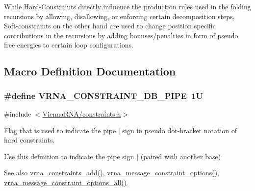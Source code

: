 While Hard-\/\+Constraints directly influence the production rules used in the folding recursions by allowing, disallowing, or enforcing certain decomposition steps, Soft-\/constraints on the other hand are used to change position specific contributions in the recursions by adding bonuses/penalties in form of pseudo free energies to certain loop configurations. 

\subsection{Macro Definition Documentation}
\hypertarget{group__constraints_ga13053547a2de5532b64b64d35e097ae1}{}
\subsubsection[{V\+R\+N\+A\+\_\+\+C\+O\+N\+S\+T\+R\+A\+I\+N\+T\+\_\+\+D\+B\+\_\+\+P\+I\+P\+E}]{\setlength{\rightskip}{0pt plus 5cm}\#define V\+R\+N\+A\+\_\+\+C\+O\+N\+S\+T\+R\+A\+I\+N\+T\+\_\+\+D\+B\+\_\+\+P\+I\+P\+E~1\+U}\label{group__constraints_ga13053547a2de5532b64b64d35e097ae1}


{\ttfamily \#include $<$\hyperlink{constraints_8h}{Vienna\+R\+N\+A/constraints.\+h}$>$}



Flag that is used to indicate the pipe \textquotesingle{}$\vert$\textquotesingle{} sign in pseudo dot-\/bracket notation of hard constraints. 

Use this definition to indicate the pipe sign \textquotesingle{}$\vert$\textquotesingle{} (paired with another base)

\begin{DoxySeeAlso}{See also}
\hyperlink{group__constraints_ga35a401f680969a556858a8dd5f1d07cc}{vrna\+\_\+constraints\+\_\+add()}, \hyperlink{group__constraints_gaa1f20b53bf09ac2e6b0dbb13f7d89670}{vrna\+\_\+message\+\_\+constraint\+\_\+options()}, \hyperlink{group__constraints_gaec7e13fa0465c2acc7a621d1aecb709f}{vrna\+\_\+message\+\_\+constraint\+\_\+options\+\_\+all()} 
\end{DoxySeeAlso}
\hypertarget{group__constraints_ga369bea82eae75fbe626f409fa425747e}{}
